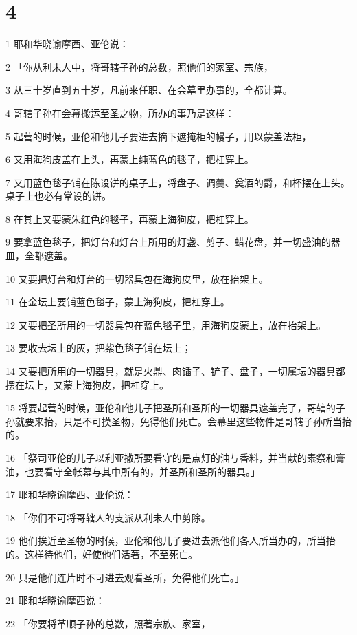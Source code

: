 \chapter{4}

\par 1 耶和华晓谕摩西、亚伦说：
\par 2 「你从利未人中，将哥辖子孙的总数，照他们的家室、宗族，
\par 3 从三十岁直到五十岁，凡前来任职、在会幕里办事的，全都计算。
\par 4 哥辖子孙在会幕搬运至圣之物，所办的事乃是这样：
\par 5 起营的时候，亚伦和他儿子要进去摘下遮掩柜的幔子，用以蒙盖法柜，
\par 6 又用海狗皮盖在上头，再蒙上纯蓝色的毯子，把杠穿上。
\par 7 又用蓝色毯子铺在陈设饼的桌子上，将盘子、调羹、奠酒的爵，和杯摆在上头。桌子上也必有常设的饼。
\par 8 在其上又要蒙朱红色的毯子，再蒙上海狗皮，把杠穿上。
\par 9 要拿蓝色毯子，把灯台和灯台上所用的灯盏、剪子、蜡花盘，并一切盛油的器皿，全都遮盖。
\par 10 又要把灯台和灯台的一切器具包在海狗皮里，放在抬架上。
\par 11 在金坛上要铺蓝色毯子，蒙上海狗皮，把杠穿上。
\par 12 又要把圣所用的一切器具包在蓝色毯子里，用海狗皮蒙上，放在抬架上。
\par 13 要收去坛上的灰，把紫色毯子铺在坛上；
\par 14 又要把所用的一切器具，就是火鼎、肉锸子、铲子、盘子，一切属坛的器具都摆在坛上，又蒙上海狗皮，把杠穿上。
\par 15 将要起营的时候，亚伦和他儿子把圣所和圣所的一切器具遮盖完了，哥辖的子孙就要来抬，只是不可摸圣物，免得他们死亡。会幕里这些物件是哥辖子孙所当抬的。
\par 16 「祭司亚伦的儿子以利亚撒所要看守的是点灯的油与香料，并当献的素祭和膏油，也要看守全帐幕与其中所有的，并圣所和圣所的器具。」
\par 17 耶和华晓谕摩西、亚伦说：
\par 18 「你们不可将哥辖人的支派从利未人中剪除。
\par 19 他们挨近至圣物的时候，亚伦和他儿子要进去派他们各人所当办的，所当抬的。这样待他们，好使他们活著，不至死亡。
\par 20 只是他们连片时不可进去观看圣所，免得他们死亡。」
\par 21 耶和华晓谕摩西说：
\par 22 「你要将革顺子孙的总数，照著宗族、家室，
